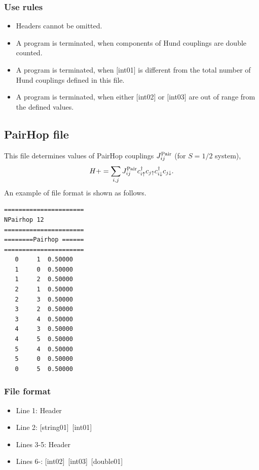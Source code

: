 \subsubsection{Use rules}
\begin{itemize}
\item Headers cannot be omitted. 
\item A program is terminated, when components of Hund couplings are double counted.
\item A program is terminated, when $[$int01$]$ is different from the total number of Hund couplings defined in this file.
\item A program is terminated, when either $[$int02$]$ or $[$int03$]$ are out of range from the defined values.
\end{itemize}

\newpage
\subsection{PairHop file}
This file determines values of PairHop couplings $J_{ij}^{\rm Pair}$ {(for $S=1/2$ system)},
\begin{equation}
H+=\sum_{i,j}J_{ij}^{\rm Pair} c_ {i \uparrow}^{\dag}c_{j\uparrow}c_{i \downarrow}^{\dag}c_{j  \downarrow}.
\end{equation}
An example of file format is shown as follows.

\begin{minipage}{12.5cm}
\begin{screen}
\begin{verbatim}
====================== 
NPairhop 12  
====================== 
========Pairhop ====== 
====================== 
   0     1  0.50000
   1     0  0.50000  
   1     2  0.50000
   2     1  0.50000
   2     3  0.50000
   3     2  0.50000
   3     4  0.50000
   4     3  0.50000
   4     5  0.50000
   5     4  0.50000
   5     0  0.50000
   0     5  0.50000
\end{verbatim}
\end{screen}
\end{minipage}

\subsubsection{File format}
 \begin{itemize}
   \item  Line 1:  Header
   \item  Line 2:   [string01]~[int01]
   \item  Lines 3-5:  Header
   \item  Lines 6-: 
   [int02]~[int03]~[double01] 
  \end{itemize}
